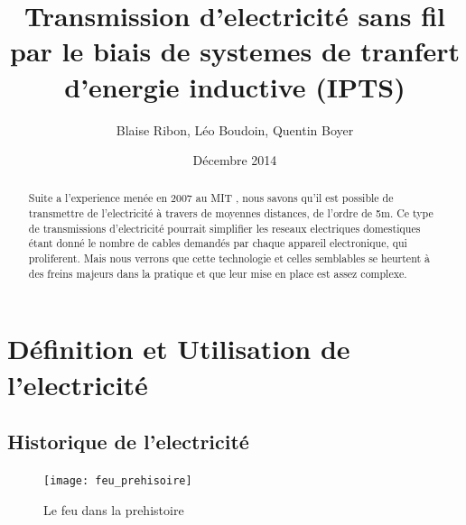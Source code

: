 \documentclass[12pt]{report}
\begin{document}

\title{Transmission d'electricité sans fil par le biais de systemes de tranfert d'energie inductive (IPTS)}
\author{Blaise Ribon, Léo Boudoin, Quentin Boyer}
\date{Décembre 2014}
\maketitle

\begin{abstract}
	Suite a l'experience menée en 2007 au MIT , nous savons qu'il est possible de transmettre de l'electricité à travers de moyennes distances, de l'ordre de 5m. Ce type de transmissions d'electricité pourrait simplifier les reseaux electriques domestiques étant donné le nombre de cables demandés par chaque appareil electronique, qui proliferent. Mais nous verrons que cette technologie et celles semblables se heurtent à des freins majeurs dans la pratique et que leur mise en place est assez complexe.
\end{abstract}

\tableofcontents

\chapter{Définition et Utilisation de l'electricité} %
\section{Historique de l'electricité}

\begin{figure}[h!]
  \caption{Le feu dans la prehistoire}
  \centering
	\texttt{[image: feu\_prehisoire]}
\end{figure}
\end{document}
